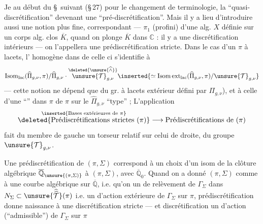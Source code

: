 Je  au début du \S\ suivant (\S\,27) pour le
changement de terminologie, la ``quasi-discrétification''
devenant une ``pré-discrétification''. Mais il y a lieu
d'introduire aussi une notion plus fine, correspondant
---   $\pi_1$ (profini) d'une  alg.
$X$ définie sur un corps alg. clos $\overline K$, quand on plonge
$\overline K$ dans $\mathbb C$ : il y a une discrétification 
 intérieurs --- on l'appellera une
prédiscrétification stricte. Dans le cas d'un
$\pi$ à lacets, l' homogène  dans  de
celle ci s'identifie à
\[
\operatorname{Isom}_{\mathrm{lac}}(\widehat{\Pi}_{g,\nu},\pi)/\widehat{\Pi}_{g,\nu}\cdot
\overset{\deleted{\unsure{\widehat{\wedge}}}}{\unsure{\mathcal T}_{g,\nu}}
\inserted{\simeq\operatorname{Isom\,ext}_{\mathrm{lac}}(\widehat{\Pi}_{g,\nu},\pi)/\unsure{\mathcal T}_{g,\nu}}
\]
--- cette notion  ne dépend que du gr. à lacets
extérieur défini par $\Pi_{g,\nu}$), et  
à celle d'une ``'' dans $\pi$
de $\pi$ sur le $\widehat{\Pi}_{g,\nu}$ ``type'' ;
L'application
\[
\overset{\inserted{\text{Bases extérieures de }\pi}}{\deleted{\text{Prédiscrétifications strictes }(\pi)}}
\longrightarrow \text{Prédiscrétifications de }(\pi)
\]
fait  du membre de gauche un torseur relatif
 sur celui de droite, du groupe $\unsure{\mathcal T}_{g,\nu}$.

Une prédiscrétification de $(\pi,\Sigma)$ correspond à un
choix d'un isom de la clôture algébrique $\overline{\mathbb Q}_{\unsure{(\pi,\Sigma)}}$  
à $(\pi,\Sigma)$, avec $\overline{\mathbb Q}_0$. Quand on a donné $(\pi,\Sigma)$ comme
 à une courbe algébrique sur $\overline{\mathbb Q}$, i.e. qu'on
 un  de relèvement de $\Gamma_\Sigma$ dans $N_\Sigma\subset\unsure{\widehat{\widehat{\mathcal T}}}(\pi)$
i.e. un  d'action extérieure de $\Gamma_\Sigma$ sur $\pi$, 
prédiscrétification  donne naissance à une discrétification
stricte --- et   discrétification  
un  d'action (``admissible'') de $\Gamma_\Sigma$ sur $\pi$ \unsure{\ldots}

